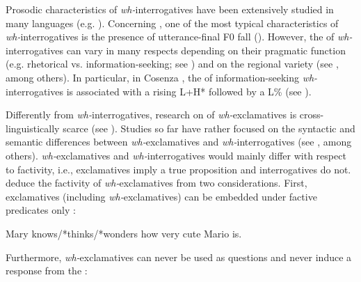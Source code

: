 \documentclass[output=paper]{langsci/langscibook}
\begin{document}
Prosodic characteristics of \textit{wh-}interrogatives have been extensively studied in many languages (e.g. \citealt{Zeng.2004,Hedberg2010,Vanrell2013whquestions}). Concerning , one of the most typical  characteristics of \textit{wh-}in\-ter\-ro\-ga\-tives is the presence of utterance-final F0 fall (\citealt{Chapallaz1964,Avesani1995,Sorianello2011exclamative}). However, the  of \textit{wh-}interrogatives can vary in many respects depending on their pragmatic function (e.g. rhetorical vs. information-seeking; see \citealt{Hedberg2010}) and on the regional variety (see \citealt{Avesani1995,Sorianello2011exclamative,GiliFivelaETAL2015intonationalvariation}, among others). In particular, in Cosenza , the  of information-seeking \textit{wh-}interrogatives is associated with a rising  L+H* followed by a  L\% (see \citealt{Sorianello2011exclamative,Sorianello2011CosenzaPowerPoint}).

Differently from \textit{wh-}interrogatives, research on  of \textit{wh-}exclamatives is cross-linguistically scarce (see \citealt{Batliner1988,Sorianello2011exclamative,Gyuris2013}). Studies so far have rather focused on the syntactic and semantic differences between \textit{wh-}exclamatives and \textit{wh-}interrogatives (see \citealt{Portner2003,Castroviejo2006}, among others). \textit{wh-}exclamatives and \textit{wh-}interrogatives would mainly differ with respect to factivity, i.e., exclamatives imply a true proposition and interrogatives do not. \citet{Portner2003} deduce the factivity of \textit{wh-}exclamatives from two considerations. First, exclamatives (including \textit{wh-}exclamatives) can be embedded under factive predicates only \citep[46]{Portner2003}:

\ea\label{ex:kel:3}
 Mary knows/*thinks/*wonders how very cute Mario is.   \\
\z

Furthermore, \textit{wh-}exclamatives can never be used as questions and never induce a response from the :

\end{document}
